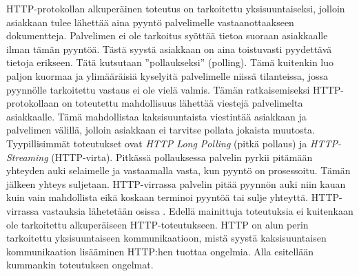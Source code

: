 \documentclass[utf8]{gradu3}
\begin{document}
HTTP-protokollan alkuperäinen toteutus on tarkoitettu yksisuuntaiseksi, jolloin asiakkaan tulee lähettää aina pyyntö palvelimelle vastaanottaakseen dokumentteja. Palvelimen ei ole tarkoitus syöttää tietoa suoraan asiakkaalle ilman tämän pyyntöä. Tästä syystä asiakkaan on aina toistuvasti pyydettävä tietoja erikseen. Tätä kutsutaan ”pollaukseksi” (polling). Tämä kuitenkin luo paljon kuormaa ja ylimääräisiä kyselyitä palvelimelle niissä tilanteissa, jossa pyynnölle tarkoitettu vastaus ei ole vielä valmis. Tämän ratkaisemiseksi HTTP-protokollaan on toteutettu mahdollisuus lähettää viestejä palvelimelta asiakkaalle. Tämä mahdollistaa kaksisuuntaista viestintää asiakkaan ja palvelimen välillä, jolloin asiakkaan ei tarvitse pollata jokaista muutosta. Tyypillisimmät toteutukset ovat \emph{HTTP Long Polling} (pitkä pollaus) ja \emph{HTTP-Streaming} (HTTP-virta). Pitkässä pollauksessa palvelin pyrkii pitämään yhteyden auki selaimelle ja vastaamalla vasta, kun pyyntö on prosessoitu. Tämän jälkeen yhteys suljetaan. HTTP-virrassa palvelin pitää pyynnön auki niin kauan kuin vain mahdollista eikä koskaan terminoi pyyntöä tai sulje yhteyttä. HTTP-virrassa vastauksia lähetetään osissa \parencite[s. 2]{long_polling}. Edellä mainittuja toteutuksia ei kuitenkaan ole tarkoitettu alkuperäiseen HTTP-toteutukseen. HTTP on alun perin tarkoitettu yksisuuntaiseen kommunikaatioon, mistä syystä kaksisuuntaisen kommunikaation lisääminen HTTP:hen tuottaa ongelmia. Alla esitellään kummankin toteutuksen ongelmat.
\end{document}
